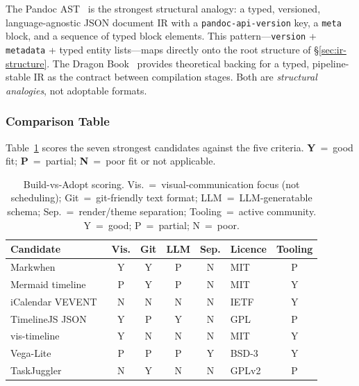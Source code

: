 The Pandoc AST~\cite{pandoc} is the strongest structural analogy: a typed,
versioned, language-agnostic JSON document IR with a \texttt{pandoc-api-version}
key, a \texttt{meta} block, and a sequence of typed block elements. This
pattern---\texttt{version} + \texttt{metadata} + typed entity lists---maps
directly onto the root structure of \S\ref{sec:ir-structure}. The Dragon
Book~\cite{dragonbook2006} provides theoretical backing for a typed,
pipeline-stable IR as the contract between compilation stages. Both are
\emph{structural analogies}, not adoptable formats.

\subsubsection{Comparison Table}

Table~\ref{tab:build-vs-adopt} scores the seven strongest candidates against
the five criteria. \textbf{Y}~=~good fit; \textbf{P}~=~partial;
\textbf{N}~=~poor fit or not applicable.

\begin{table}[h]
\centering
\small
\begin{tabular}{p{3.2cm}ccccp{1.6cm}c}
\toprule
\textbf{Candidate}
  & \textbf{Vis.}
  & \textbf{Git}
  & \textbf{LLM}
  & \textbf{Sep.}
  & \textbf{Licence}
  & \textbf{Tooling} \\
\midrule
Markwhen~\cite{markwhen}
  & Y & Y & P & N & MIT & P \\
Mermaid timeline~\cite{mermaiddocs2024}
  & P & Y & P & N & MIT & Y \\
iCalendar VEVENT~\cite{ical-rfc5545}
  & N & N & N & N & IETF & Y \\
TimelineJS JSON~\cite{timelinejs}
  & Y & P & Y & N & GPL & P \\
vis-timeline~\cite{vistimeline}
  & Y & N & N & N & MIT & Y \\
Vega-Lite~\cite{vegalite2017}
  & P & P & P & Y & BSD-3 & Y \\
TaskJuggler~\cite{taskjuggler}
  & N & Y & N & N & GPLv2 & P \\
\bottomrule
\end{tabular}
\caption{Build-vs-Adopt scoring. Vis.~=~visual-communication focus (not
scheduling); Git~=~git-friendly text format; LLM~=~LLM-generatable schema;
Sep.~=~render/theme separation; Tooling~=~active community. Y~=~good;
P~=~partial; N~=~poor.}
\label{tab:build-vs-adopt}
\end{table}

